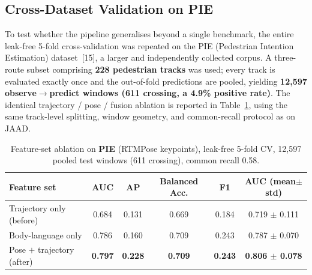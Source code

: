 
\subsection{Cross-Dataset Validation on PIE}

To test whether the pipeline generalises beyond a single benchmark, the entire
leak-free 5-fold cross-validation was repeated on the PIE (Pedestrian Intention
Estimation) dataset~[15], a larger and independently collected corpus. A
three-route subset comprising \textbf{228 pedestrian tracks} was used; every
track is evaluated exactly once and the out-of-fold predictions are pooled,
yielding \textbf{12{,}597 observe$\rightarrow$predict windows (611 crossing, a
4.9\% positive rate)}. The identical trajectory / pose / fusion ablation is
reported in Table~\ref{tab:ablation_pie}, using the same track-level splitting,
window geometry, and common-recall protocol as on JAAD.

\begin{table}[t]
\centering
\caption{Feature-set ablation on \textbf{PIE} (RTMPose keypoints), leak-free
5-fold CV, 12{,}597 pooled test windows (611 crossing), common recall 0.58.}
\label{tab:ablation_pie}
\begin{tabular}{lccccc}
\hline
Feature set & AUC & AP & Balanced Acc. & F1 & AUC (mean$\pm$std) \\
\hline
Trajectory only (before)    & 0.684 & 0.131 & 0.669 & 0.184 & 0.719 $\pm$ 0.111 \\
Body-language only          & 0.786 & 0.160 & 0.709 & 0.243 & 0.787 $\pm$ 0.070 \\
Pose $+$ trajectory (after) & \textbf{0.797} & \textbf{0.228} & \textbf{0.709} & \textbf{0.243} & \textbf{0.806 $\pm$ 0.078} \\
\hline
\end{tabular}
\end{table}


